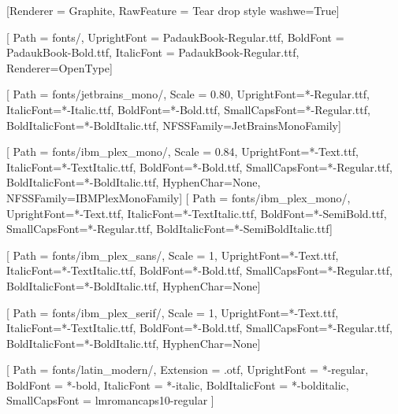 \setmainfont[
    Path = fonts/,
    UprightFont = PadaukBook-Regular.ttf,
    BoldFont = PadaukBook-Bold.ttf,
    ItalicFont = PadaukBook-Regular.ttf,    
]{Padauk Book}
[Renderer = Graphite, RawFeature = {Tear drop style washwe=True}]

[
    Path = fonts/,
    UprightFont = PadaukBook-Regular.ttf,
    BoldFont = PadaukBook-Bold.ttf,
    ItalicFont = PadaukBook-Regular.ttf,
    Renderer=OpenType]
\DeclareTextFontCommand{\textpadauk}{\padaukfamily}

[
    Path = fonts/jetbrains_mono/,
    Scale = 0.80,
    UprightFont=*-Regular.ttf,
    ItalicFont=*-Italic.ttf,
    BoldFont=*-Bold.ttf,
    SmallCapsFont=*-Regular.ttf,
    BoldItalicFont=*-BoldItalic.ttf,
    NFSSFamily=JetBrainsMonoFamily]
\DeclareTextFontCommand{\textjetbrainsmono}{\jetbrainsmonofamily}

[
    Path = fonts/ibm_plex_mono/,
    Scale = 0.84,
    UprightFont=*-Text.ttf,
    ItalicFont=*-TextItalic.ttf,
    BoldFont=*-Bold.ttf,
    SmallCapsFont=*-Regular.ttf,
    BoldItalicFont=*-BoldItalic.ttf,
    HyphenChar=None,
    NFSSFamily=IBMPlexMonoFamily]
\DeclareTextFontCommand{\textibmplexmono}{\ibmplexmonofamily}
[
    Path = fonts/ibm_plex_mono/,
    UprightFont=*-Text.ttf,
    ItalicFont=*-TextItalic.ttf,
    BoldFont=*-SemiBold.ttf,
    SmallCapsFont=*-Regular.ttf,
    BoldItalicFont=*-SemiBoldItalic.ttf]
\DeclareTextFontCommand{\textibmplexmonoa}{\ibmplexmonofamilya}

[
    Path = fonts/ibm_plex_sans/,
    Scale = 1,
    UprightFont=*-Text.ttf,
    ItalicFont=*-TextItalic.ttf,
    BoldFont=*-Bold.ttf,
    SmallCapsFont=*-Regular.ttf,
    BoldItalicFont=*-BoldItalic.ttf,
    HyphenChar=None]
\DeclareTextFontCommand{\textibmplexsans}{\ibmplexsansfamily}

[
    Path = fonts/ibm_plex_serif/,
    Scale = 1,
    UprightFont=*-Text.ttf,
    ItalicFont=*-TextItalic.ttf,
    BoldFont=*-Bold.ttf,
    SmallCapsFont=*-Regular.ttf,
    BoldItalicFont=*-BoldItalic.ttf,
    HyphenChar=None]
\DeclareTextFontCommand{\textibmplexserif}{\ibmplexseriffamily}

%
[
    Path = fonts/latin_modern/,
    Extension = .otf,
    UprightFont = *-regular, 
    BoldFont = *-bold,
    ItalicFont = *-italic,
    BoldItalicFont = *-bolditalic,
    SmallCapsFont = lmromancaps10-regular
]
\DeclareTextFontCommand{\textlatinmodern}{\latinmodernfamily}

